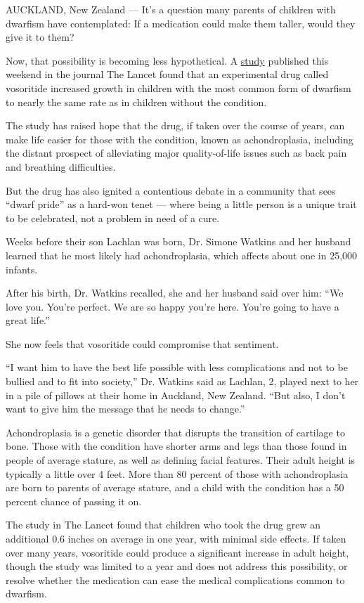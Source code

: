 AUCKLAND, New Zealand --- It's a question many parents of children with
dwarfism have contemplated: If a medication could make them taller,
would they give it to them?

Now, that possibility is becoming less hypothetical. A
\href{https://www.thelancet.com/journals/lancet/article/PIIS0140-6736(20)31541-5/fulltext?rss=yes}{study}
published this weekend in the journal The Lancet found that an
experimental drug called vosoritide increased growth in children with
the most common form of dwarfism to nearly the same rate as in children
without the condition.

The study has raised hope that the drug, if taken over the course of
years, can make life easier for those with the condition, known as
achondroplasia, including the distant prospect of alleviating major
quality-of-life issues such as back pain and breathing difficulties.

But the drug has also ignited a contentious debate in a community that
sees ``dwarf pride'' as a hard-won tenet --- where being a little person
is a unique trait to be celebrated, not a problem in need of a cure.

Weeks before their son Lachlan was born, Dr. Simone Watkins and her
husband learned that he most likely had achondroplasia, which affects
about one in 25,000 infants.

After his birth, Dr. Watkins recalled, she and her husband said over
him: ``We love you. You're perfect. We are so happy you're here. You're
going to have a great life.''

She now feels that vosoritide could compromise that sentiment.

``I want him to have the best life possible with less complications and
not to be bullied and to fit into society,'' Dr. Watkins said as
Lachlan, 2, played next to her in a pile of pillows at their home in
Auckland, New Zealand. ``But also, I don't want to give him the message
that he needs to change.''

Achondroplasia is a genetic disorder that disrupts the transition of
cartilage to bone. Those with the condition have shorter arms and legs
than those found in people of average stature, as well as defining
facial features. Their adult height is typically a little over 4 feet.
More than 80 percent of those with achondroplasia are born to parents of
average stature, and a child with the condition has a 50 percent chance
of passing it on.

The study in The Lancet found that children who took the drug grew an
additional 0.6 inches on average in one year, with minimal side effects.
If taken over many years, vosoritide could produce a significant
increase in adult height, though the study was limited to a year and
does not address this possibility, or resolve whether the medication can
ease the medical complications common to dwarfism.

